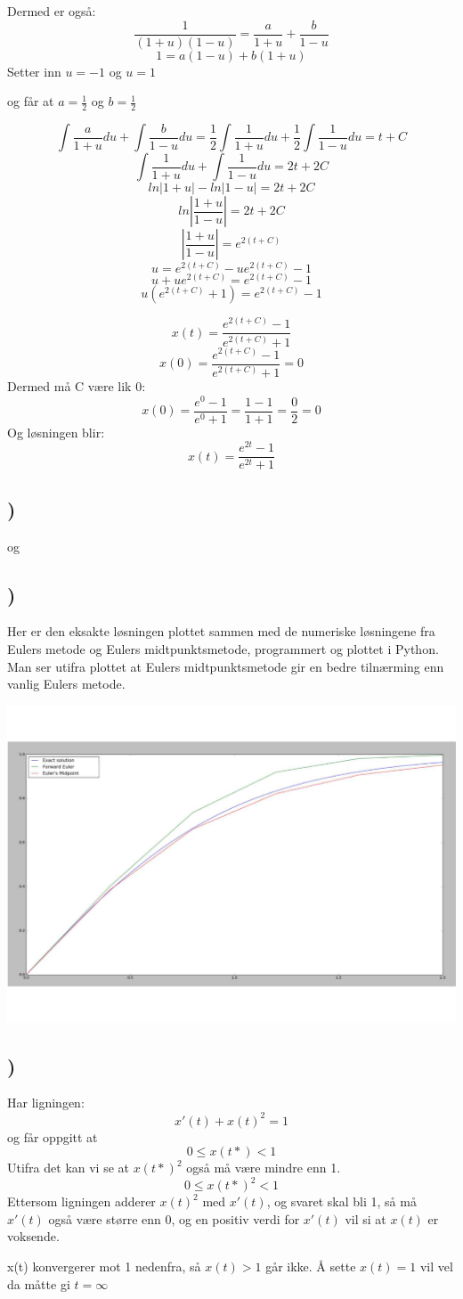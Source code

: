 \documentclass[a4paper,10pt,norsk]{article}
\begin{document}
Dermed er også:
\[\frac{1}{(1+u)(1-u)} = \frac{a}{1+u} + \frac{b}{1-u}\]
\[1 = a(1-u) + b(1+u)\]
Setter inn $u=-1$ og $u=1$ 

og får at $a=\frac{1}{2}$ og $b=\frac{1}{2}$

\[\int{\frac{a}{1+u}du} + \int{\frac{b}{1-u}du} = \frac{1}{2}\int{\frac{1}{1+u}du} + \frac{1}{2}\int{\frac{1}{1-u}du} = t+C\]
\[\int{\frac{1}{1+u}du} + \int{\frac{1}{1-u}du} = 2t+2C\]
\[ln|1+u| - ln|1-u| = 2t + 2C\]
\[ln\left|\frac{1+u}{1-u}\right| = 2t+2C\]
\[\left|\frac{1+u}{1-u}\right| = e^{2(t+C)}\]
\[u = e^{2(t+C)} - ue^{2(t+C)} - 1\]
\[u + ue^{2(t+C)} = e^{2(t+C)} - 1\]
\[u(e^{2(t+C)} + 1) = e^{2(t+C)} - 1\]

\[x(t) = \frac{e^{2(t+C)} - 1}{e^{2(t+C)} + 1}\]
\[x(0) = \frac{e^{2(t+C)} - 1}{e^{2(t+C)} + 1} = 0\]
Dermed må C være lik 0:
\[x(0) = \frac{e^{0}-1}{e^{0} + 1} = \frac{1-1}{1+1} = \frac{0}{2} = 0\]
Og løsningen blir:
\[x(t) = \frac{e^{2t} - 1}{e^{2t} + 1}\]

\subsection{)}
og
\subsection{)}
Her er den eksakte løsningen plottet sammen med de numeriske løsningene fra Eulers metode og Eulers midtpunktsmetode, programmert og plottet i Python.
Man ser utifra plottet at Eulers midtpunktsmetode gir en bedre tilnærming enn vanlig Eulers metode.

\includegraphics[scale=0.6]{oblig2_2.pdf}

\subsection{)}
Har ligningen:
\[x'(t) + x(t)^{2} = 1\]
og får oppgitt at
\[0 \leq x(t*) < 1\]
Utifra det kan vi se at $x(t*)^{2}$ også må være mindre enn 1.
\[0 \leq x(t*)^{2} < 1\]
Ettersom ligningen adderer $x(t)^{2}$ med $x'(t)$, og svaret skal bli 1, så må $x'(t)$ også være større enn 0, og en positiv verdi for $x'(t)$ vil si at $x(t)$ er voksende. 

x(t) konvergerer mot 1 nedenfra, så $x(t) > 1$ går ikke.
Å sette $x(t) = 1$ vil vel da måtte gi $t = \infty$
\end{document}
